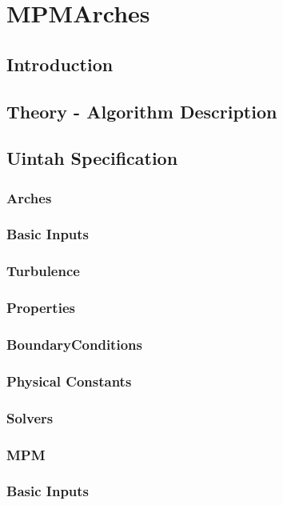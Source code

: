 
\section{MPMArches}

\subsection{Introduction}

\subsection{Theory - Algorithm Description}

\subsection{Uintah Specification}

\subsubsection{Arches}

\subsubsection{Basic Inputs}
\subsubsection{Turbulence}
\subsubsection{Properties}
\subsubsection{BoundaryConditions}
\subsubsection{Physical Constants}
\subsubsection{Solvers}


\subsubsection{MPM}

\subsubsection{Basic Inputs}
